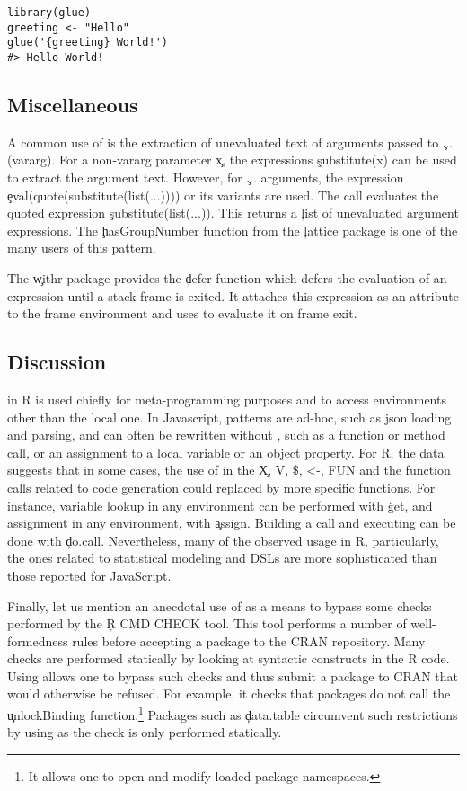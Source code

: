 \documentclass[review,screen,acmsmall]{acmart}
\begin{document}
\begin{lstlisting}
library(glue)
greeting <- "Hello"
glue('{greeting} World!')
#> Hello World!
\end{lstlisting}

\subsection{Miscellaneous}
A common use of \eval is the extraction of unevaluated text of arguments passed
to \c{...} (vararg). For a non-vararg parameter \c{x}, the expressions
\c{substitute(x)} can be used to extract the argument text. However, for \c{...}
arguments, the expression \c{eval(quote(substitute(list(...))))} or its variants
are used. The \eval call evaluates the quoted expression
\c{substitute(list(...))}. This returns a \c{list} of unevaluated argument
expressions. The \c{hasGroupNumber} function from the \c{lattice} package is one
of the many users of this pattern.

The \c{withr} package provides the \c{defer} function which defers the
evaluation of an expression until a stack frame is exited. It attaches this
expression as an attribute to the frame environment and uses \eval to evaluate
it on frame exit.

\subsection{Discussion}

\Eval in R is used chiefly for meta-programming purposes and to access
environments other than the local one. In Javascript, patterns are ad-hoc, such
as json loading and parsing, and can often be rewritten without \eval, such as a
function or method call, or an assignment to a local variable or an object
property. For R, the data suggests that in some cases, the use of \eval in the
\c{X, V, \$, <-, FUN} and the function calls related to code generation could
replaced by more specific functions. For instance, variable lookup in any
environment can be performed with \c{get}, and assignment in any environment,
with \c{assign}. Building a call and executing can be done with \c{do.call}.
Nevertheless, many of the observed \eval usage in R, particularly, the ones
related to statistical modeling and DSLs are more sophisticated than those
reported for JavaScript.

Finally, let us mention an anecdotal use of \eval as a means to bypass some
checks performed by the \c{R CMD CHECK} tool. This tool performs a number of
well-formedness rules before accepting a package to the CRAN repository. Many
checks are performed statically by looking at syntactic constructs in the R
code. Using \eval allows one to bypass such checks and thus submit a package to
CRAN that would otherwise be refused. For example,  it checks that packages
do not call the \c{unlockBinding} function.\footnote{It allows one to open and
modify loaded package namespaces.} Packages such as \c{data.table} circumvent
such restrictions by using \eval as the check is only performed statically.
\end{document}

